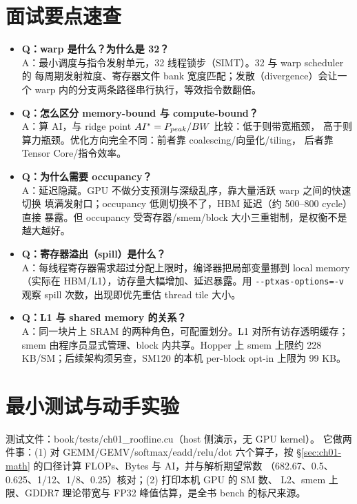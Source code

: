 \section{面试要点速查}

\begin{itemize}
\item \textbf{Q：warp 是什么？为什么是 32？}\\
  A：最小调度与指令发射单元，32 线程锁步（SIMT）。32 与 warp scheduler 的
  每周期发射粒度、寄存器文件 bank 宽度匹配；发散（divergence）会让一个
  warp 内的分支两条路径串行执行，等效指令数翻倍。
\item \textbf{Q：怎么区分 memory-bound 与 compute-bound？}\\
  A：算 AI，与 ridge point $AI^{*} = P\sb{peak}/BW$ 比较：低于则带宽瓶颈，
  高于则算力瓶颈。优化方向完全不同：前者靠 coalescing/向量化/tiling，
  后者靠 Tensor Core/指令效率。
\item \textbf{Q：为什么需要 occupancy？}\\
  A：延迟隐藏。GPU 不做分支预测与深级乱序，靠大量活跃 warp 之间的快速切换
  填满发射口；occupancy 低则切换不了，HBM 延迟（约 500--800 cycle）直接
  暴露。但 occupancy 受寄存器/smem/block 大小三重钳制，是权衡不是越大越好。
\item \textbf{Q：寄存器溢出（spill）是什么？}\\
  A：每线程寄存器需求超过分配上限时，编译器把局部变量挪到 local memory
  （实际在 HBM/L1），访存量大幅增加、延迟暴露。用
  \texttt{-{}-ptxas-options=\allowbreak{}-v} 观察 spill 次数，出现即优先重估
  thread tile 大小。
\item \textbf{Q：L1 与 shared memory 的关系？}\\
  A：同一块片上 SRAM 的两种角色，可配置划分。L1 对所有访存透明缓存；
  smem 由程序员显式管理、block 内共享。Hopper 上 smem 上限约 228 KB/SM；后续架构须另查，SM120 的本机 per-block opt-in 上限为 99 KB。
\end{itemize}

\section{最小测试与动手实验}\label{sec:ch01-test}

测试文件：book/tests/ch01\_roofline.cu（host 侧演示，无 GPU kernel）。
它做两件事：(1) 对 GEMM/GEMV/softmax/eadd/relu/dot 六个算子，按
\S\ref{sec:ch01-math} 的口径计算 FLOPs、Bytes 与 AI，并与解析期望常数
（682.67、0.5、0.625、1/12、1/8、0.25）核对；(2) 打印本机 GPU 的 SM 数、
L2、smem 上限、GDDR7 理论带宽与 FP32 峰值估算，是全书 bench 的标尺来源。

